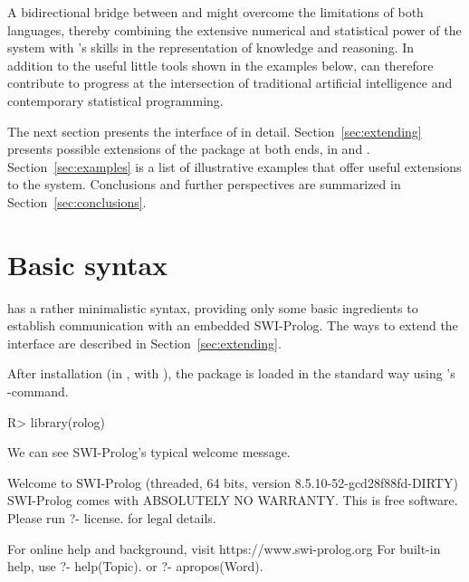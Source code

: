 \documentclass[article]{jss}
\begin{document}
A bidirectional bridge between  and  might overcome
the limitations of both languages, thereby combining the extensive numerical and
statistical power of the  system with 's skills in
the representation of knowledge and reasoning. In addition to the useful little
tools shown in the examples below,  can therefore contribute to
progress at the intersection of traditional artificial intelligence and
contemporary statistical programming.

The next section presents the interface of  in detail. 
Section~\ref{sec:extending} presents possible extensions of the package at both
ends, in  and . Section~\ref{sec:examples} is a
list of illustrative examples that offer useful extensions to the 
system. Conclusions and further perspectives are summarized in 
Section~\ref{sec:conclusions}.

\section{Basic syntax}

 has a rather minimalistic syntax, providing only some basic
ingredients to establish communication with an embedded SWI-Prolog. The ways to
extend the interface are described in Section~\ref{sec:extending}.

After installation (in , with ), the
package is loaded in the standard way
using 's -command.


\begin{Schunk}
\begin{Sinput}
R> library(rolog)
\end{Sinput}
\end{Schunk}

We can see SWI-Prolog's typical welcome message.

\begin{Schunk}
\begin{Soutput}
Welcome to SWI-Prolog (threaded, 64 bits, version 8.5.10-52-gcd28f88fd-DIRTY)
SWI-Prolog comes with ABSOLUTELY NO WARRANTY. This is free software.
Please run ?- license. for legal details.

For online help and background, visit https://www.swi-prolog.org
For built-in help, use ?- help(Topic). or ?- apropos(Word).
\end{Soutput}
\end{Schunk}
\end{document}

